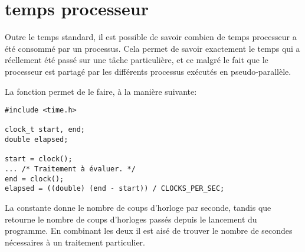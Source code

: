 \section{temps processeur}

Outre le temps standard, il est possible de savoir combien de temps processeur a été consommé par un processus. Cela permet de savoir exactement le temps qui a réellement été passé sur une tâche particulière, et ce malgré le fait que le processeur est partagé par les différents processus exécutés en pseudo-parallèle.

La fonction  permet de le faire, à la manière suivante:

\begin{lstlisting}
#include <time.h>

clock_t start, end;
double elapsed;

start = clock();
... /* Traitement à évaluer. */
end = clock();
elapsed = ((double) (end - start)) / CLOCKS_PER_SEC;
\end{lstlisting}

La constante  donne le nombre de coups d'horloge par seconde, tandis que  retourne le nombre de coups d'horloges passés depuis le lancement du programme. En combinant les deux il est aisé de trouver le nombre de secondes nécessaires à un traitement particulier.




